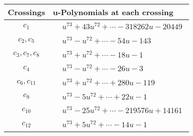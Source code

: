 \documentclass[1p]{elsarticle_modified}
\theoremstyle{definition}
\begin{document}
\begin{tabular}{m{50pt}|m{274pt}}
Crossings & \hspace{64pt}u-Polynomials at each crossing \\
\hline $$\begin{aligned}c_{1}\end{aligned}$$&$\begin{aligned}
&u^{73}+43 u^{72}+\cdots-318262 u-20449
\end{aligned}$\\
\hline $$\begin{aligned}c_{2},c_{5}\end{aligned}$$&$\begin{aligned}
&u^{73}- u^{72}+\cdots-54 u-143
\end{aligned}$\\
\hline $$\begin{aligned}c_{3},c_{7},c_{8}\end{aligned}$$&$\begin{aligned}
&u^{73}+u^{72}+\cdots-18 u-1
\end{aligned}$\\
\hline $$\begin{aligned}c_{4}\end{aligned}$$&$\begin{aligned}
&u^{73}- u^{72}+\cdots-26 u-3
\end{aligned}$\\
\hline $$\begin{aligned}c_{6},c_{11}\end{aligned}$$&$\begin{aligned}
&u^{73}+u^{72}+\cdots+280 u-119
\end{aligned}$\\
\hline $$\begin{aligned}c_{9}\end{aligned}$$&$\begin{aligned}
&u^{73}-5 u^{72}+\cdots+22 u-1
\end{aligned}$\\
\hline $$\begin{aligned}c_{10}\end{aligned}$$&$\begin{aligned}
&u^{73}-25 u^{72}+\cdots-219576 u+14161
\end{aligned}$\\
\hline $$\begin{aligned}c_{12}\end{aligned}$$&$\begin{aligned}
&u^{73}+5 u^{72}+\cdots-14 u-1
\end{aligned}$\\
\hline
\end{tabular}\\~\\
\end{document}
